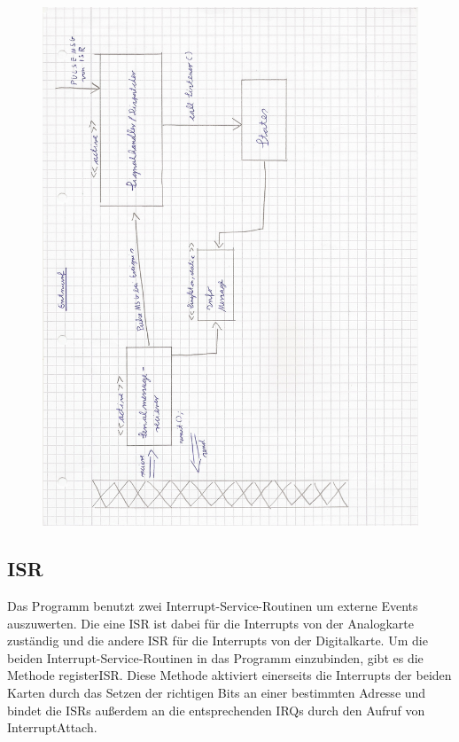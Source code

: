 \documentclass[a4paper, 11pt]{article}
\begin{document}
\begin{figure}[H]
\centering 
    \includegraphics[scale=0.8]{SI/si3.jpg}
    \label{si3}
\end{figure}

\newpage

\subsection{ISR}
Das Programm benutzt zwei Interrupt-Service-Routinen um externe Events auszuwerten. Die eine ISR ist dabei für die Interrupts von der Analogkarte zuständig und die andere ISR für die Interrupts von der Digitalkarte. Um die beiden Interrupt-Service-Routinen in das Programm einzubinden, gibt es die Methode {\ttfamily registerISR}. Diese Methode aktiviert einerseits die Interrupts der beiden Karten durch das Setzen der richtigen Bits an einer bestimmten Adresse und bindet die ISRs außerdem an die entsprechenden IRQs durch den Aufruf von {\ttfamily InterruptAttach}.
\end{document}

